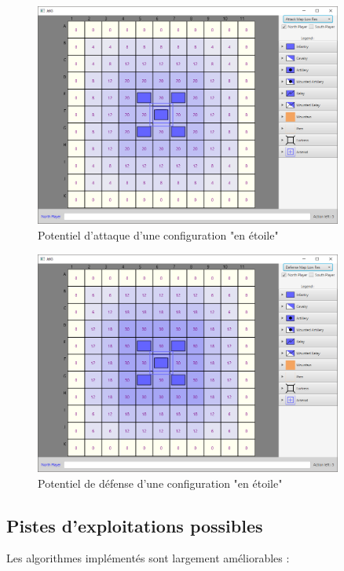 \documentclass[a4paper]{report}
\begin{document}
\begin{figure}[H]
\centering
\includegraphics[width=0.9\textwidth]{screensAnalyse/attackStar}
\caption{Potentiel d'attaque d'une configuration "en étoile"}\label{fig:analyse_staratk}
\end{figure}

\begin{figure}[H]
\centering
\includegraphics[width=0.9\textwidth]{screensAnalyse/defenseStar}
\caption{Potentiel de défense d'une configuration "en étoile"}\label{fig:analyse_stardef}
\end{figure}


\newpage

\subsection{Pistes d'exploitations possibles}
Les algorithmes implémentés sont largement améliorables : 
\end{document}
